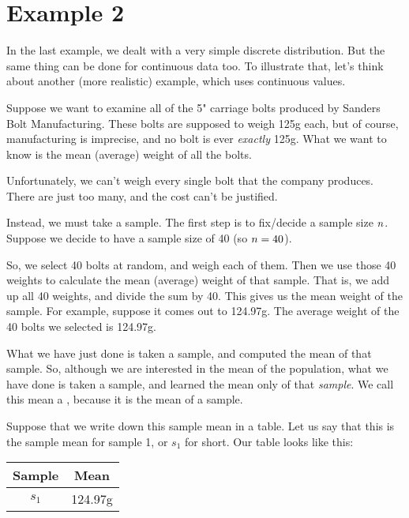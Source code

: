 \documentclass[../../../main.tex]{subfiles}
\begin{document}
\section{Example 2}

In the last example, we dealt with a very simple discrete distribution. But the same thing can be done for continuous data too. To illustrate that, let's think about another (more realistic) example, which uses continuous values. 

Suppose we want to examine all of the 5" carriage bolts produced by Sanders Bolt Manufacturing. These bolts are supposed to weigh 125g each, but of course, manufacturing is imprecise, and no bolt is ever \emph{exactly} 125g. What we want to know is the mean (average) weight of all the bolts.

Unfortunately, we can't weigh every single bolt that the company produces. There are just too many, and the cost can't be justified.

Instead, we must take a sample. The first step is to fix/decide a sample size $\samplesize/$. Suppose we decide to have a sample size of 40 (so $\samplesize/ = 40$). 

So, we select 40 bolts at random, and weigh each of them. Then we use those 40 weights to calculate the mean (average) weight of that sample. That is, we add up all 40 weights, and divide the sum by 40. This gives us the mean weight of the sample. For example, suppose it comes out to 124.97g. The average weight of the 40 bolts we selected is 124.97g.

What we have just done is taken a sample, and computed the mean of that sample. So, although we are interested in the mean of the population, what we have done is taken a sample, and learned the mean only of that \emph{sample}. We call this mean a , because it is the mean of a sample.

Suppose that we write down this sample mean in a table. Let us say that this is the sample mean for sample 1, or $s_{1}$ for short. Our table looks like this:

\begin{center}
  \begin{tabular}{| c | c |}
    \hline
    \textbf{Sample} & \textbf{Mean} \\ \hline
    $s_{1}$ & 124.97g \\ \hline
  \end{tabular}
\end{center}
\end{document}
